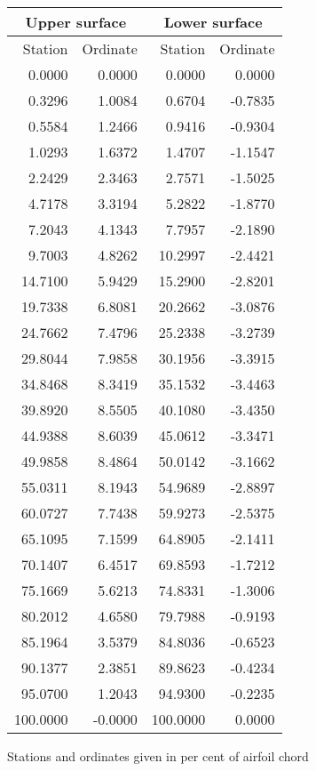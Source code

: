 \documentclass[11pt]{book}
\begin{document}
 \hspace{4mm}
 \begin{tabular}{|r|r|r|r|} \hline 
 \multicolumn{2}{|c|}{Upper surface} & \multicolumn{2}{|c|}{Lower surface} \\
 \hline
 Station & Ordinate & Station & Ordinate \\
 \hline
0.0000 & 0.0000 & 0.0000 & 0.0000 \\
0.3296 & 1.0084 & 0.6704 & -0.7835 \\
0.5584 & 1.2466 & 0.9416 & -0.9304 \\
1.0293 & 1.6372 & 1.4707 & -1.1547 \\
2.2429 & 2.3463 & 2.7571 & -1.5025 \\
4.7178 & 3.3194 & 5.2822 & -1.8770 \\
7.2043 & 4.1343 & 7.7957 & -2.1890 \\
9.7003 & 4.8262 & 10.2997 & -2.4421 \\
14.7100 & 5.9429 & 15.2900 & -2.8201 \\
19.7338 & 6.8081 & 20.2662 & -3.0876 \\
24.7662 & 7.4796 & 25.2338 & -3.2739 \\
29.8044 & 7.9858 & 30.1956 & -3.3915 \\
34.8468 & 8.3419 & 35.1532 & -3.4463 \\
39.8920 & 8.5505 & 40.1080 & -3.4350 \\
44.9388 & 8.6039 & 45.0612 & -3.3471 \\
49.9858 & 8.4864 & 50.0142 & -3.1662 \\
55.0311 & 8.1943 & 54.9689 & -2.8897 \\
60.0727 & 7.7438 & 59.9273 & -2.5375 \\
65.1095 & 7.1599 & 64.8905 & -2.1411 \\
70.1407 & 6.4517 & 69.8593 & -1.7212 \\
75.1669 & 5.6213 & 74.8331 & -1.3006 \\
80.2012 & 4.6580 & 79.7988 & -0.9193 \\
85.1964 & 3.5379 & 84.8036 & -0.6523 \\
90.1377 & 2.3851 & 89.8623 & -0.4234 \\
95.0700 & 1.2043 & 94.9300 & -0.2235 \\
100.0000 & -0.0000 & 100.0000 & 0.0000 \\
 \hline 
 \end{tabular}
 \vspace{8mm}

Stations and ordinates given in per cent of airfoil chord
\end{document}
